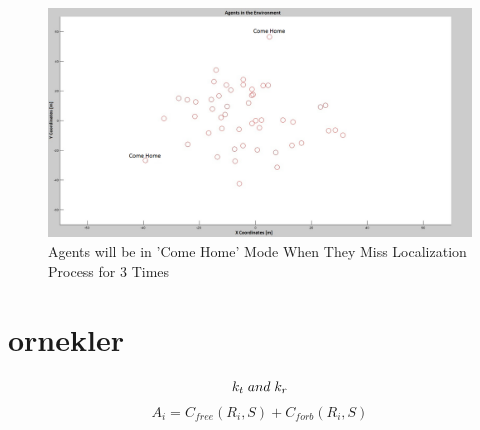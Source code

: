 \documentclass[twoside]{article}
\begin{document}
			\begin{figure}[H]
				\caption{Agents will be in 'Come Home' Mode When They Miss Localization Process for 3 Times}
				\centerline{\includegraphics[scale = 0.30]{Lost-2-3}}
			\end{figure} 		
		
		
		
		
		
		
		
		
		
		
		
		
		
		
		
		
		
		
		
		
		
		
		
		
		
		
		
		
		
		
		
		
		
		
		
		
		
		
		
		
		
		
		
		
		
		
		
		
		
		
		
		
		
		\section{ornekler}
		
		\begin{equation}
 k_t  \hspace{0.1cm}and\hspace{0.1cm} k_r
		\end{equation}
			\begin{equation}
			A_i = C_{free}(R_i,S) + C_{forb}(R_i,S)
			\end{equation}	
			
\end{document}
